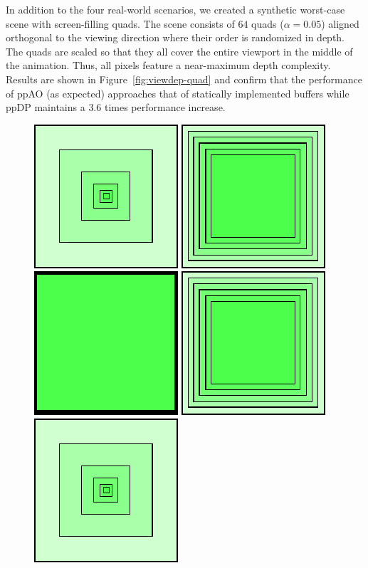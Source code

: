 \documentclass{egpubl}
\newcommand{\stencil}{ppAO}
\newcommand{\dloop}{ppDP}
\begin{document}
In addition to the four real-world scenarios, we created a synthetic worst-case scene with screen-filling quads.
The scene consists of $64$ quads ($\alpha=0.05$) aligned orthogonal to the viewing direction where their order is randomized in depth. 
The quads are scaled so that they all cover the entire viewport in the middle of the animation.
Thus, all pixels feature a near-maximum depth complexity.
Results are shown in Figure~\ref{fig:viewdep-quad} and confirm that the performance of \stencil{} (as expected) approaches that of statically implemented buffers while \dloop{} maintains a $3.6$ times performance increase. 



\begin{figure}[t]
  \centering
  \begin{minipage}{0.9\linewidth}\centering 
  \begin{minipage}{1.0\linewidth}\centering 
    \includegraphics[width=0.14\linewidth]{figures/quads1}\hfill 
    \includegraphics[width=0.14\linewidth]{figures/quads2}\hfill 
    \includegraphics[width=0.14\linewidth]{figures/quads3}\hfill 
    \includegraphics[width=0.14\linewidth]{figures/quads2}\hfill 
    \includegraphics[width=0.14\linewidth]{figures/quads1}\hfill \hspace{6mm}
  \end{minipage}
  \begin{minipage}{1.0\linewidth}\centering

\end{minipage}
\end{minipage}
\end{figure}
\end{document}
